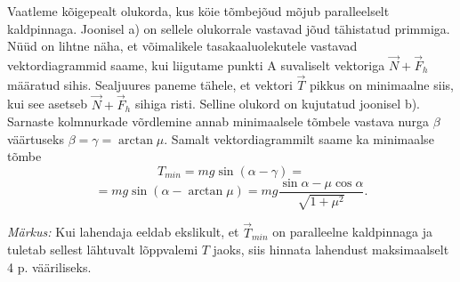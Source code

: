 \documentclass[12pt,a5paper]{article}
\begin{document}
Vaatleme kõigepealt olukorda, kus köie tõmbejõud mõjub paralleelselt kaldpinnaga. Joonisel a) on sellele olukorrale vastavad jõud tähistatud primmiga. Nüüd on lihtne näha, et võimalikele tasakaaluolekutele vastavad vektordiagrammid saame, kui liigutame punkti A suvaliselt vektoriga $\overrightarrow{N}+\overrightarrow{F}_h$ määratud sihis. Sealjuures paneme tähele, et vektori $\overrightarrow{T}$ pikkus on minimaalne siis, kui see asetseb $\overrightarrow{N}+\overrightarrow{F}_h$ sihiga risti. Selline olukord on kujutatud joonisel b). Sarnaste kolmnurkade võrdlemine annab minimaalsele tõmbele vastava nurga $\beta$ väärtuseks $\beta=\gamma=\arctan\mu$. Samalt vektordiagrammilt saame ka minimaalse tõmbe
\[T_{min}=mg\sin(\alpha-\gamma)=\]
\[=mg\sin(\alpha-\arctan\mu)= mg\frac{\sin\alpha-\mu\cos\alpha}{\sqrt{1+\mu^2}}.\]


\emph{Märkus:} Kui lahendaja eeldab ekslikult, et $\overrightarrow{T}_{min}$ on paralleelne kaldpinnaga ja tuletab sellest lähtuvalt lõppvalemi $T$ jaoks, siis hinnata lahendust
maksimaalselt 4 p. vääriliseks.
\end{document}
